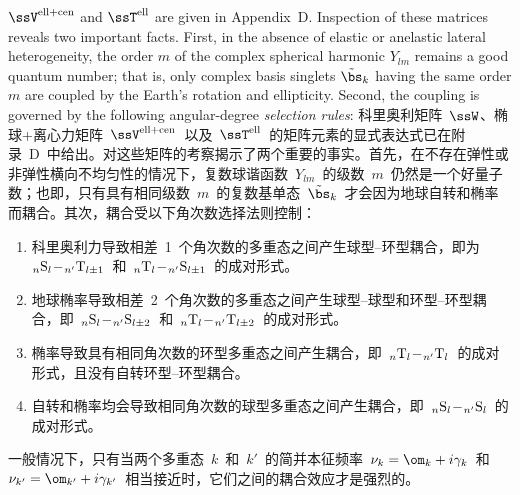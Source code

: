 $\ssV^{\rm ell+cen}$ and $\ssT^{\rm ell}$ are given in Appendix~D.
Inspection of these matrices reveals two important facts.
First, in the absence of elastic or anelastic lateral
heterogeneity, the order $m$ of the complex spherical harmonic
$Y_{lm}$ remains a good quantum number; that is, only complex
basis singlets $\tilde{\bs}_k$ having the same order $m$ are
coupled by the Earth's rotation and ellipticity.  Second, the coupling
is governed by the following angular-degree {\em selection rules\/}:
\fi
科里奥利矩阵~$\ssW$、椭球+离心力矩阵~$\ssV^{\rm ell+cen}$~以及~$\ssT^{\rm ell}$~的矩阵元素的显式表达式已在附录~D~中给出。对这些矩阵的考察揭示了两个重要的事实。首先，在不存在弹性或非弹性横向不均匀性的情况下，复数球谐函数~$Y_{lm}$~的级数~$m$~仍然是一个好量子数；也即，只有具有相同级数~$m$~的复数基单态~$\tilde{\bs}_k$~才会因为地球自转和椭率而耦合。其次，耦合受以下角次数选择法则控制：
%
%
\begin{enumerate}
\item

科里奥利力导致相差~1~个角次数的多重态之间产生球型--环型耦合，即为~${}_n{\rm S}_l\!-\!{}_{n'}{\rm T}_{l\pm1}$~和~${}_n{\rm T}_l\!-\!{}_{n'}{\rm S}_{l\pm1}$~的成对形式。
\item

地球椭率导致相差~2~个角次数的多重态之间产生球型--球型和环型--环型耦合，即~${}_n{\rm S}_l\!-\!{}_{n'}{\rm S}_{l\pm2}$~和~${}_n{\rm T}_l\!-\!{}_{n'}{\rm T}_{l\pm2}$~的成对形式。
\item

椭率导致具有相同角次数的环型多重态之间产生耦合，即~${}_n{\rm T}_l\!-\!{}_{n'}{\rm T}_l$~的成对形式，且没有自转环型--环型耦合。
\item

自转和椭率均会导致相同角次数的球型多重态之间产生耦合，即~${}_n{\rm S}_l\!-\!{}_{n'}{\rm S}_l$~的成对形式。
\end{enumerate}

一般情况下，只有当两个多重态~$k$~和~$k'$~的简并本征频率~$\nu_k=\om_k+i\gamma_k$~和~$\nu_{k'}=\om_{k'}+i\gamma_{k'}$~相当接近时，它们之间的耦合效应才是强烈的。

